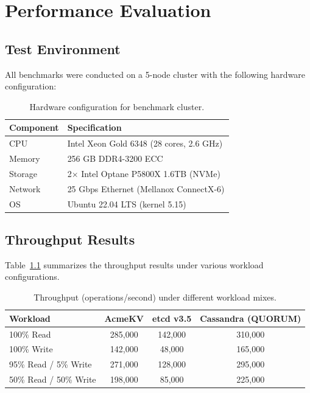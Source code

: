 \documentclass[12pt,a4paper]{report}
\begin{document}
\chapter{Performance Evaluation}
\label{ch:performance}

\section{Test Environment}

All benchmarks were conducted on a 5-node cluster with the following hardware configuration:

\begin{table}[H]
\centering
\caption{Hardware configuration for benchmark cluster.}
\begin{tabular}{@{}ll@{}}
\toprule
\textbf{Component} & \textbf{Specification} \\
\midrule
CPU & Intel Xeon Gold 6348 (28 cores, 2.6 GHz) \\
Memory & 256 GB DDR4-3200 ECC \\
Storage & 2$\times$ Intel Optane P5800X 1.6TB (NVMe) \\
Network & 25 Gbps Ethernet (Mellanox ConnectX-6) \\
OS & Ubuntu 22.04 LTS (kernel 5.15) \\
\bottomrule
\end{tabular}
\end{table}

\section{Throughput Results}

Table~\ref{tab:throughput} summarizes the throughput results under various workload configurations.

\begin{table}[H]
\centering
\caption{Throughput (operations/second) under different workload mixes.}
\label{tab:throughput}
\begin{tabular}{@{}lccc@{}}
\toprule
\textbf{Workload} & \textbf{AcmeKV} & \textbf{etcd v3.5} & \textbf{Cassandra (QUORUM)} \\
\midrule
100\% Read          & 285,000 & 142,000 & 310,000 \\
100\% Write         & 142,000 & 48,000  & 165,000 \\
95\% Read / 5\% Write  & 271,000 & 128,000 & 295,000 \\
50\% Read / 50\% Write & 198,000 & 85,000  & 225,000 \\
\bottomrule
\end{tabular}
\end{table}
\end{document}
